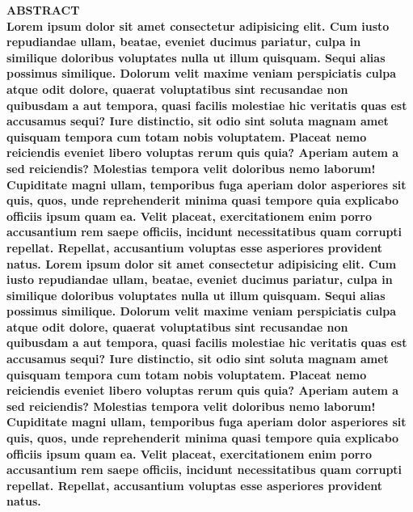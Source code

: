 \documentclass[12pt,a4paper,oneside,brazil]{abntex2}
\begin{document}
\centering
\ABNTEXchapterfont\bfseries{\textsc{\MakeUppercase{Abstract}}}\\
\vspace*{3cm}
\justifying
\normalfont
Lorem ipsum dolor sit amet consectetur adipisicing elit. Cum iusto repudiandae ullam, beatae, eveniet ducimus pariatur, culpa in similique doloribus voluptates nulla ut illum quisquam. Sequi alias possimus similique. Dolorum velit maxime veniam perspiciatis culpa atque odit dolore, quaerat voluptatibus sint recusandae non quibusdam a aut tempora, quasi facilis molestiae hic veritatis quas est accusamus sequi? Iure distinctio, sit odio sint soluta magnam amet quisquam tempora cum totam nobis voluptatem. Placeat nemo reiciendis eveniet libero voluptas rerum quis quia? Aperiam autem a sed reiciendis? Molestias tempora velit doloribus nemo laborum! Cupiditate magni ullam, temporibus fuga aperiam dolor asperiores sit quis, quos, unde reprehenderit minima quasi tempore quia explicabo officiis ipsum quam ea. Velit placeat, exercitationem enim porro accusantium rem saepe officiis, incidunt necessitatibus quam corrupti repellat. Repellat, accusantium voluptas esse asperiores provident natus.
Lorem ipsum dolor sit amet consectetur adipisicing elit. Cum iusto repudiandae ullam, beatae, eveniet ducimus pariatur, culpa in similique doloribus voluptates nulla ut illum quisquam. Sequi alias possimus similique. Dolorum velit maxime veniam perspiciatis culpa atque odit dolore, quaerat voluptatibus sint recusandae non quibusdam a aut tempora, quasi facilis molestiae hic veritatis quas est accusamus sequi? Iure distinctio, sit odio sint soluta magnam amet quisquam tempora cum totam nobis voluptatem. Placeat nemo reiciendis eveniet libero voluptas rerum quis quia? Aperiam autem a sed reiciendis? Molestias tempora velit doloribus nemo laborum! Cupiditate magni ullam, temporibus fuga aperiam dolor asperiores sit quis, quos, unde reprehenderit minima quasi tempore quia explicabo officiis ipsum quam ea. Velit placeat, exercitationem enim porro accusantium rem saepe officiis, incidunt necessitatibus quam corrupti repellat. Repellat, accusantium voluptas esse asperiores provident natus.
\clearpage


\listoffigures   %
\clearpage

\listoftables    %
\clearpage

\tableofcontents
\clearpage
\end{document}
